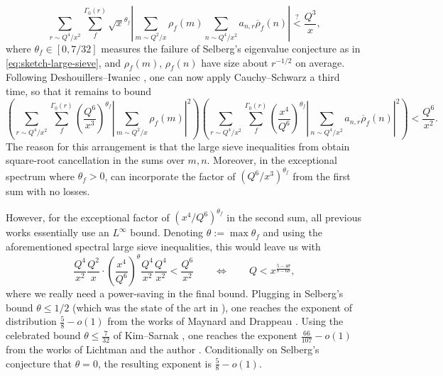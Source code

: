 \documentclass[reqno,11pt]{amsart}
\theoremstyle{remark}
\numberwithin{equation}{section}
\renewcommand{\bar}{\overline}
\begin{document}
\begin{equation} \label{eq:before-di-cs}
    \sum_{r \sim Q^4/x^2}
    \sum_{f}^{\Gamma_0(r)}
    \sqrt{x}^{\theta_f} \left\vert \sum_{m \sim Q^2/x} \rho_f(m) \sum_{n \sim Q^4/x^2} a_{n,r} \bar\rho_f(n)\right\vert
    \stackrel{?}
    {<} \frac{Q^3}{x},
\end{equation}
where $\theta_f \in [0, 7/32]$ measures the failure of Selberg's eigenvalue conjecture as in \cref{eq:sketch-large-sieve}, and $\rho_f(m)$, $\rho_f(n)$ have size about $r^{-1/2}$ on average. Following Deshouillers--Iwaniec \cite{deshouillers1982kloosterman}, one can now apply Cauchy--Schwarz a third time, so that it remains to bound
\begin{equation} \label{eq:after-di-cs}
    \left(
    \sum_{r \sim Q^4/x^2}
    \sum_{f}^{\Gamma_0(r)}
    \left(\frac{Q^6}{x^3}\right)^{\theta_f} \left\vert \sum_{m \sim Q^2/x} \rho_f(m)\right\vert^2 \right) 
    \left(
    \sum_{r \sim Q^4/x^2}
    \sum_{f}^{\Gamma_0(r)} \left(\frac{x^4}{Q^6}\right)^{\theta_f}
    \left\vert \sum_{n \sim Q^4/x^2} a_{n,r} \bar\rho_f(n)\right\vert^2 \right)
    < 
    \frac{Q^6}{x^2}.
\end{equation}
The reason for this arrangement is that the large sieve inequalities from \cite{deshouillers1982kloosterman} obtain square-root cancellation in the sums over $m, n$. Moreover, in the exceptional spectrum where $\theta_f > 0$, \cite[Theorem 7]{deshouillers1982kloosterman} can incorporate the factor of $(Q^6/x^3)^{\theta_f}$ from the first sum with no losses. 

However, for the exceptional factor of $(x^4/Q^6)^{\theta_f}$ in the second sum, all previous works \cite{maynard2025primes2,lichtman2023primes,drappeau2015theoremes,pascadi2023smooth} essentially use an $L^\infty$ bound. Denoting $\theta := \max \theta_f$ and using the aforementioned spectral large sieve inequalities, this would leave us with
\[
    \frac{Q^4}{x^2} \frac{Q^2}{x} \cdot \left(\frac{x^4}{Q^6}\right)^\theta \frac{Q^4}{x^2} \frac{Q^4}{x^2} 
    < 
    \frac{Q^6}{x^2}
    \qquad \iff 
    \qquad 
    Q < x^{\frac{5-4\theta}{8-6\theta}},
\]
where we really need a power-saving in the final bound.
Plugging in Selberg's bound $\theta \le 1/2$ (which was the state of the art in \cite{deshouillers1982greatest}), one reaches the exponent of distribution $\tfrac{5}{8} - o(1)$ from the works of Maynard \cite{maynard2025primes2} and Drappeau \cite{drappeau2015theoremes}. Using the celebrated bound $\theta \le \tfrac{7}{32}$ of Kim--Sarnak \cite[Appendix 2]{kim2003functoriality}, one reaches the exponent $\tfrac{66}{107}-o(1)$ from the works of Lichtman \cite{lichtman2023primes} and the author \cite{pascadi2023smooth}. Conditionally on Selberg's conjecture that $\theta = 0$, the resulting exponent is $\tfrac{5}{8} - o(1)$.
\end{document}
